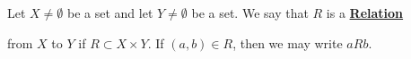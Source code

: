 \newcommand{\Relation}[0]{
    \bf \hyperref[def:Relation]{Relation} \rm
}
\begin{df}[Relation]
\label{def:Relation}

\rm
    Let $X \neq \emptyset$ be a set
	and let $Y\neq \emptyset$ be a set. 
    We say that $R$ is a \Relation
    from $X$ to $Y$ if $R \subset X \times Y$. 
    If $(a,b) \in R$, then we may write
    $a R b$. 
\end{df}
